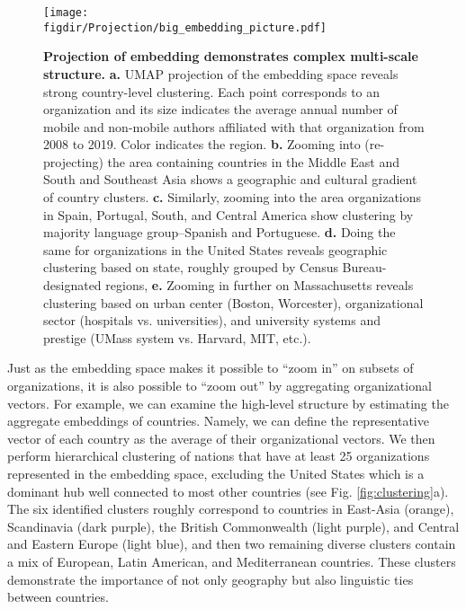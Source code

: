 \documentclass[12pt]{article} %
\def\figdir{../Figs}
\begin{document}
\begin{figure}[hp!]
	\centering
	\texttt{[image: \\figdir/Projection/big\_embedding\_picture.pdf]}
	\caption{
		\textbf{Projection of embedding demonstrates complex multi-scale structure.}
		\textbf{a.}
		UMAP projection \autocite{mcinnes2018umap} of the embedding space reveals strong country-level clustering.
		Each point corresponds to an organization and its size indicates the average annual number of mobile and non-mobile authors affiliated with that organization from 2008 to 2019.
		Color indicates the region.
		\textbf{b.} Zooming into (re-projecting) the area containing countries in the Middle East and South and Southeast Asia shows a geographic and cultural gradient of country clusters.
		\textbf{c.} Similarly, zooming into the area organizations in Spain, Portugal, South, and Central America show clustering by majority language group--Spanish and Portuguese.
		\textbf{d.} Doing the same for organizations in the United States reveals geographic clustering based on state, roughly grouped by Census Bureau-designated regions,
		\textbf{e.} Zooming in further on Massachusetts reveals clustering based on urban center (Boston, Worcester), organizational sector (hospitals vs. universities), and university systems and prestige (UMass system vs. Harvard, MIT, etc.).
	}
	\label{fig:projection}
\end{figure}


Just as the embedding space makes it possible to ``zoom in'' on subsets of organizations, it is also possible to ``zoom out'' by aggregating organizational vectors.
For example, we can examine the high-level structure by estimating the aggregate embeddings of countries.
Namely, we can define the representative vector of each country as the average of their organizational vectors.
We then perform hierarchical clustering of nations that have at least 25 organizations represented in the embedding space, excluding the United States which is a dominant hub well connected to most other countries (see Fig. \ref{fig:clustering}a).
The six identified clusters roughly correspond to countries in East-Asia (orange), Scandinavia (dark purple), the British Commonwealth (light purple), and Central and Eastern Europe (light blue), and then two remaining diverse clusters contain a mix of European, Latin American, and Mediterranean countries.
These clusters demonstrate the importance of not only geography but also linguistic ties between countries.
\end{document}
